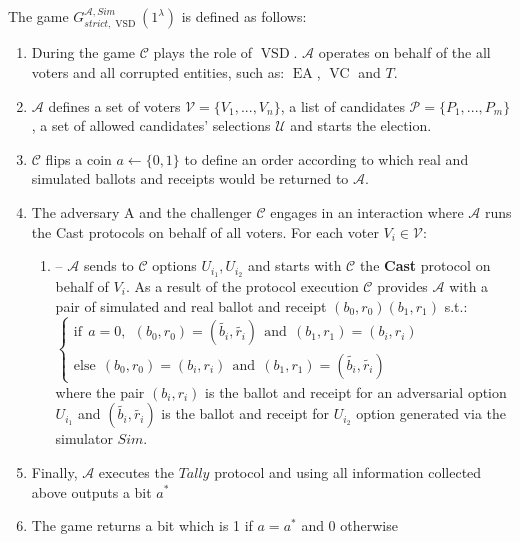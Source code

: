 \documentclass[12pt]{article}
\DeclareMathOperator{\vsd}{VSD}
\DeclareMathOperator{\ea}{EA}
\DeclareMathOperator{\bb}{BB}
\DeclareMathOperator{\voc}{VC}
\begin{document}
The game $G_{strict, \vsd}^{\mathcal{A},Sim}(1^{\lambda})$ is defined as follows:
\begin{enumerate}
\item During the game $\mathcal{C}$ plays the role of $\vsd$. 
 $\mathcal{A}$ operates on behalf of the all voters and all corrupted entities, such as: $\ea$, $\voc$ and $T$.
\item $\mathcal{A}$ defines a set of voters  $\mathcal{V} = \{V_1,...,V_n\}$, a list of candidates  $\mathcal{P} = \{P_1,...,P_m\}$, a set of allowed candidates' selections $\mathcal{U}$ and  starts the election.
\item $\mathcal{C}$ flips a coin $a \leftarrow \{0,1\}$ to define an order according to which real and simulated ballots and receipts would be returned to $\mathcal{A}$.
\item The adversary A and the challenger $\mathcal{C}$ engages in an interaction where $\mathcal{A}$ runs the Cast protocols on behalf of all voters. For each voter $V_i \in \mathcal{V}$:
\begin{enumerate}
\item[] --  $\mathcal{A}$ sends to  $\mathcal{C}$ options $U_{i_1}, U_{i_2}$ and starts with $\mathcal{C}$ the  \textbf{Cast}  protocol on behalf of $V_i$. As a result of the protocol execution $\mathcal{C}$  provides $\mathcal{A}$ with a pair of simulated and real ballot and receipt $(b_0, r_0) (b_1, r_1)$ s.t.:\\
$ \begin{cases}
 \text{if} ~~a =0,~~ (b_0,r_0) = (\tilde{b_i},\tilde{r_i}) ~~ \text{and} ~~  (b_1,r_1) = (b_i,r_i)   \\ 
 \text{else}~~ (b_0,r_0) =(b_i,r_i)~~  \text{and} ~~  (b_1,r_1) =(\tilde{b_i},\tilde{r_i})
\end{cases}$\\ 
where the pair $(b_i, r_i)$ is the ballot and receipt for an adversarial option $U_{i_1}$ and $(\tilde{b_i},\tilde{r_i})$ is the ballot and receipt for  $U_{i_2}$ option generated via the simulator $Sim$.
\end{enumerate}
\item Finally, $\mathcal{A}$  executes the $Tally$ protocol  and using all information collected above outputs a bit $a^*$
\item The game returns a bit which is 1 if $a = a^*$ and 0 otherwise
\end{enumerate}
\end{document}
